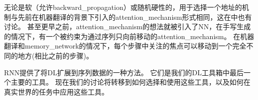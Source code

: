无论是软（允许\gls{backward_propagation}）或随机硬性的，用于选择一个地址的机制与先前在机器翻译的背景下引入的\gls{attention_mechanism}形式相同\citep{Bahdanau-et-al-ICLR2015-small}，这在中也有讨论。
甚至更早之前，\gls{attention_mechanism}的想法就被引入了\gls{NN}，在手写生成的情况下\citep{Graves-arxiv2013}，有一个被约束为通过序列只向前移动的\gls{attention_mechanism}。
在机器翻译和\gls{memory_network}的情况下，每个步骤中关注的焦点可以移动到一个完全不同的地方(相比之前的步骤)。

\gls{RNN}提供了将\gls{DL}扩展到序列数据的一种方法。
它们是我们的\gls{DL}工具箱中最后一个主要的工具。
现在我们的讨论将转移到如何选择和使用这些工具，以及如何在真实世界的任务中应用这些工具。

